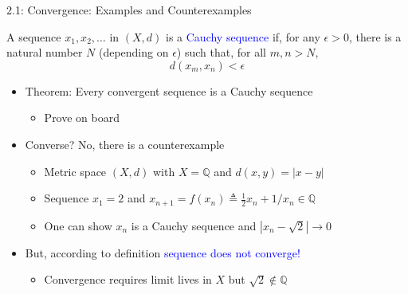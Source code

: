 \documentclass[10pt,english]{beamer}
\begin{document}
\begin{frame}{2.1: Convergence: Examples and Counterexamples}

\begin{definition}
A sequence $x_1,x_2,\ldots$ in $(X,d)$ is a \textcolor{blue}{Cauchy sequence} if, for any $\epsilon >0$, there is a natural number $N$ (depending on $\epsilon$) such that, for all $m,n > N$,\vspace{-2mm}
\begin{equation*}
d \left( x_m, x_n \right) < \epsilon
\end{equation*}
\end{definition}

\begin{itemize}
\setlength\itemsep{3mm}
\item<1-> Theorem: Every convergent sequence is a Cauchy sequence \vspace{1mm}
\begin{itemize} 
  \setlength\itemsep{1.5mm}
  \item Prove on board \pause
\end{itemize}
\item Converse? \pause No, there is a counterexample \vspace{1mm}
\begin{itemize} 
  \setlength\itemsep{1.5mm}
  \item Metric space $(X,d)$ with $X=\mathbb{Q}$ and $d(x,y)=|x-y|$
  \item Sequence $x_1 = 2$ and $x_{n+1} = f(x_n) \triangleq \frac{1}{2} x_n + 1/x_n \in \mathbb{Q} $
  \item One can show $x_n$ is a Cauchy sequence and $|x_n - \sqrt{2}|\to 0$
\end{itemize}
\item<4-> But, according to definition \textcolor{blue}{sequence does not converge!}  \vspace{1mm}
\begin{itemize} 
  \setlength\itemsep{1.5mm}
  \item Convergence requires limit lives in $X$ but $\sqrt{2} \notin \mathbb{Q}$
\end{itemize}
\end{itemize}
\end{frame}
\end{document}
